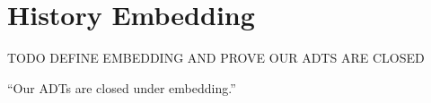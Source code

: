 \section{History Embedding}
\label{sec:embedding}

TODO DEFINE EMBEDDING AND PROVE OUR ADTS ARE CLOSED

\begin{theorem}
  “Our ADTs are closed under embedding.”
\end{theorem}
